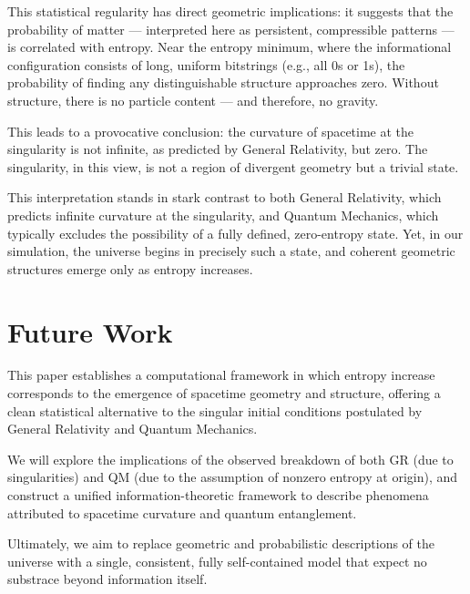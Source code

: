 \documentclass[11pt]{article}
\begin{document}
This statistical regularity has direct geometric implications: it suggests that the probability of matter — interpreted here as persistent, compressible patterns — is correlated with entropy. Near the entropy minimum, where the informational configuration consists of long, uniform bitstrings (e.g., all 0s or 1s), the probability of finding any distinguishable structure approaches zero. Without structure, there is no particle content — and therefore, no gravity.

This leads to a provocative conclusion: the curvature of spacetime at the singularity is not infinite, as predicted by General Relativity, but zero. The singularity, in this view, is not a region of divergent geometry but a trivial state.

This interpretation stands in stark contrast to both General Relativity, which predicts infinite curvature at the singularity, and Quantum Mechanics, which typically excludes the possibility of a fully defined, zero-entropy state. Yet, in our simulation, the universe begins in precisely such a state, and coherent geometric structures emerge only as entropy increases.


\section{Future Work}

This paper establishes a computational framework in which entropy increase corresponds to the emergence of spacetime geometry and structure, offering a clean statistical alternative to the singular initial conditions postulated by General Relativity and Quantum Mechanics.

We will explore the implications of the observed breakdown of both GR (due to singularities) and QM (due to the assumption of nonzero entropy at origin), and construct a unified information-theoretic framework to describe phenomena attributed to spacetime curvature and quantum entanglement.

Ultimately, we aim to replace geometric and probabilistic descriptions of the universe with a single, consistent, fully self-contained model that expect no substrace beyond information itself.
\end{document}
